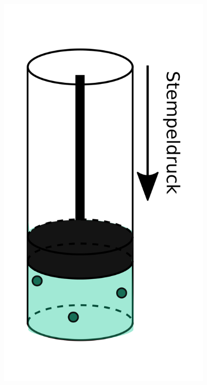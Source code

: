\documentclass{beamer}
\begin{document}
\begin{frame}
\begin{columns}[c]
\begin{column}{5cm}
\begin{center}
\includegraphics[width=0.8\textwidth]{stempeldruck_gas_3.png}
\end{center}
\end{column}

\end{columns}


\end{frame}
\end{document}

